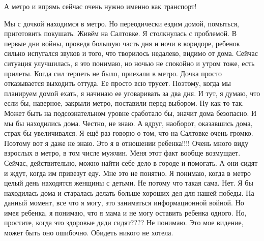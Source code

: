 \begin{itemize}
А метро и впрямь сейчас очень нужно именно как транспорт!


Мы с дочкой находимся в метро. Но переодически ездим домой, помыться,
приготовить покушать. Живём на Салтовке. Я столкнулась с проблемой. В первые
дни войны, проведя большую часть дня и ночи в коридоре, ребенок сильно
испугался звуков и того, что творилось недалеко, видимо от дома. Сейчас
ситуация улучшилась, я это понимаю, но ночью не спокойно и утром тоже, есть
прилеты. Когда сил терпеть не было, приехали в метро. Дочка просто отказывается
выходить оттуда. Ее просто всю трусет. Поэтому, когда мы планируем домой ехать,
я начинаю ее уговаривать за два дня. И тут, я думаю, что если бы, наверное,
закрыли метро, поставили перед выбором. Ну как-то так. Может быть на
подсознательном уровне сработало бы, значит дома безопасно. И мы бы находились
дома. Честно, не знаю. А вдруг, наоборот, оказавшись дома, страх бы
увеличивался. Я ещё раз говорю о том, что на Салтовке очень громко. Поэтому вот
я даже не знаю. Это я в отношении ребенка!!!! Очень много виду взрослых в
метро, в том числе мужчин. Меня этот факт вообще возмущает. Сейчас,
действительно, можно найти себе дело в городе и помогать. А они сидят и ждут,
когда им привезут еду. Мне это не понятно. Я понимаю, когда в метро целый день
находятся женщины с детьми. Не потому что такая сама. Нет. Я бы находилась дома
и старалась делать больше хороших дел для нашей победы. На данный момент, все
что я могу, это заниматься информационной войной. Но имея ребенка, я понимаю,
что я мама и не могу оставить ребенка одного. Но, простите, когда это здоровые
дяди сидят???? Не понимаю. Это мое видение, может быть оно ошибочно. Обидеть
никого не хотела.




\end{itemize} %
